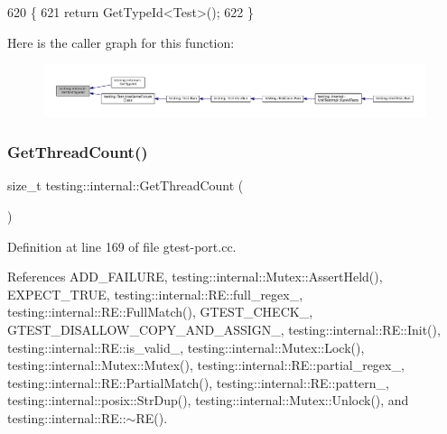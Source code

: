 \begin{DoxyCode}
620                        \{
621   \textcolor{keywordflow}{return} GetTypeId<Test>();
622 \}
\end{DoxyCode}
Here is the caller graph for this function\+:
\nopagebreak
\begin{figure}[H]
\begin{center}
\leavevmode
\includegraphics[width=350pt]{namespacetesting_1_1internal_ad0d66d56ead224263cd100c1d6bfc562_icgraph}
\end{center}
\end{figure}
\mbox{\label{namespacetesting_1_1internal_a3b9b3649cd04558bf46c75de52a7ef34}} 
\subsubsection{\texorpdfstring{Get\+Thread\+Count()}{GetThreadCount()}}
{\footnotesize\ttfamily size\+\_\+t testing\+::internal\+::\+Get\+Thread\+Count (\begin{DoxyParamCaption}{ }\end{DoxyParamCaption})}



Definition at line 169 of file gtest-\/port.\+cc.



References A\+D\+D\+\_\+\+F\+A\+I\+L\+U\+RE, testing\+::internal\+::\+Mutex\+::\+Assert\+Held(), E\+X\+P\+E\+C\+T\+\_\+\+T\+R\+UE, testing\+::internal\+::\+R\+E\+::full\+\_\+regex\+\_\+, testing\+::internal\+::\+R\+E\+::\+Full\+Match(), G\+T\+E\+S\+T\+\_\+\+C\+H\+E\+C\+K\+\_\+, G\+T\+E\+S\+T\+\_\+\+D\+I\+S\+A\+L\+L\+O\+W\+\_\+\+C\+O\+P\+Y\+\_\+\+A\+N\+D\+\_\+\+A\+S\+S\+I\+G\+N\+\_\+, testing\+::internal\+::\+R\+E\+::\+Init(), testing\+::internal\+::\+R\+E\+::is\+\_\+valid\+\_\+, testing\+::internal\+::\+Mutex\+::\+Lock(), testing\+::internal\+::\+Mutex\+::\+Mutex(), testing\+::internal\+::\+R\+E\+::partial\+\_\+regex\+\_\+, testing\+::internal\+::\+R\+E\+::\+Partial\+Match(), testing\+::internal\+::\+R\+E\+::pattern\+\_\+, testing\+::internal\+::posix\+::\+Str\+Dup(), testing\+::internal\+::\+Mutex\+::\+Unlock(), and testing\+::internal\+::\+R\+E\+::$\sim$\+R\+E().


